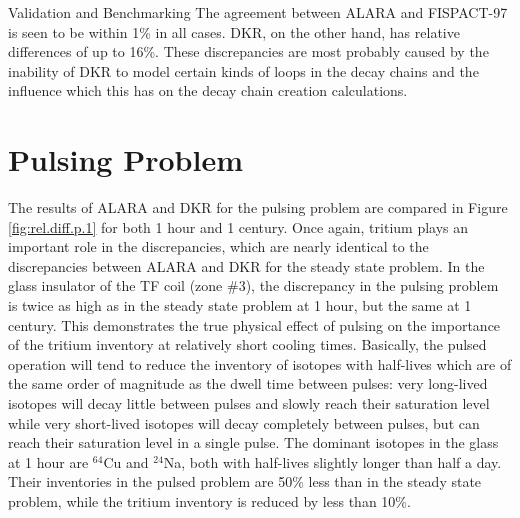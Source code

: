 \begin{chapter}{Validation and Benchmarking}
The agreement between ALARA and FISPACT-97 is seen to be within 1\% in
all cases.  DKR, on the other hand, has relative differences of up to
16\%.  These discrepancies are most probably caused by the inability
of DKR to model certain kinds of loops in the decay chains and the
influence which this has on the decay chain creation calculations.

\section{Pulsing Problem}

\begin{figure*}[htbp]
  \begin{center}
    \caption{Relative difference between ALARA and DKR for
      the pulsing problem at cooling times of 1 hour and 1 century.}
    \label{fig:rel.diff.p.1}
  \end{center}
\end{figure*}

\begin{figure*}[htbp]
  \begin{center}
    \caption{Relative difference between exact pulsed solution and steady state approximation at various cooling times.}
    \label{fig:rel.diff.approx}
  \end{center}
\end{figure*}
The results of ALARA and DKR for the pulsing problem are compared in
Figure \ref{fig:rel.diff.p.1} for both 1 hour and 1 century.  Once
again, tritium plays an important role in the discrepancies, which are
nearly identical to the discrepancies between ALARA and DKR for the
steady state problem.  In the glass insulator of the TF coil (zone
\#3), the discrepancy in the pulsing problem is twice as high as in
the steady state problem at 1 hour, but the same at 1 century.  This
demonstrates the true physical effect of pulsing on the importance of
the tritium inventory at relatively short cooling times.  Basically,
the pulsed operation will tend to reduce the inventory of isotopes
with half-lives which are of the same order of magnitude as the dwell
time between pulses: very long-lived isotopes will decay little
between pulses and slowly reach their saturation level while very
short-lived isotopes will decay completely between pulses, but can
reach their saturation level in a single pulse\cite{bib:sisolak}.  The
dominant isotopes in the glass at 1 hour are $^{64}$Cu and $^{24}$Na,
both with half-lives slightly longer than half a day.  Their
inventories in the pulsed problem are 50\% less than in the steady
state problem, while the tritium inventory is reduced by less than
10\%.


\end{chapter}
